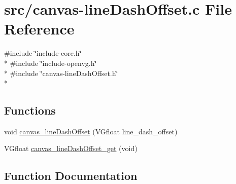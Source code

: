 \hypertarget{canvas-lineDashOffset_8c}{}\section{src/canvas-\/line\+Dash\+Offset.c File Reference}
\label{canvas-lineDashOffset_8c}
{\ttfamily \#include \char`\"{}include-\/core.\+h\char`\"{}}\\*
{\ttfamily \#include \char`\"{}include-\/openvg.\+h\char`\"{}}\\*
{\ttfamily \#include \char`\"{}canvas-\/line\+Dash\+Offset.\+h\char`\"{}}\\*
\subsection*{Functions}
\begin{DoxyCompactItemize}
\item 
void \hyperlink{canvas-lineDashOffset_8c_ac82d658168d8886ca5a05eb73946a478}{canvas\+\_\+line\+Dash\+Offset} (V\+Gfloat line\+\_\+dash\+\_\+offset)
\item 
V\+Gfloat \hyperlink{canvas-lineDashOffset_8c_ae864016d6881fa6327b206c8b9587517}{canvas\+\_\+line\+Dash\+Offset\+\_\+get} (void)
\end{DoxyCompactItemize}


\subsection{Function Documentation}
\hypertarget{canvas-lineDashOffset_8c_ac82d658168d8886ca5a05eb73946a478}{}
